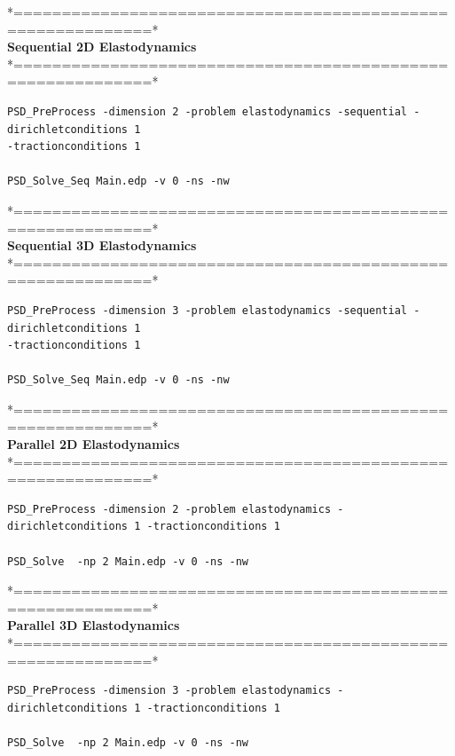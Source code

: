 {{*============================================================*\\
\textbf{ Sequential 2D Elastodynamics}  \\                    
*============================================================*\\

\begin{lstlisting}[style=Linux]
PSD_PreProcess -dimension 2 -problem elastodynamics -sequential -dirichletconditions 1  
-tractionconditions 1 

PSD_Solve_Seq Main.edp -v 0 -ns -nw
\end{lstlisting}
*============================================================*\\
\textbf{ Sequential 3D Elastodynamics}  \\                    
*============================================================*\\

\begin{lstlisting}[style=Linux]
PSD_PreProcess -dimension 3 -problem elastodynamics -sequential -dirichletconditions 1 
-tractionconditions 1 

PSD_Solve_Seq Main.edp -v 0 -ns -nw
\end{lstlisting}
*============================================================*\\
\textbf{ Parallel 2D Elastodynamics}   \\                   
*============================================================*\\

\begin{lstlisting}[style=Linux]
PSD_PreProcess -dimension 2 -problem elastodynamics -dirichletconditions 1 -tractionconditions 1 

PSD_Solve  -np 2 Main.edp -v 0 -ns -nw
\end{lstlisting}
*============================================================*\\
\textbf{ Parallel 3D Elastodynamics } \\                    
*============================================================*\\

\begin{lstlisting}[style=Linux]
PSD_PreProcess -dimension 3 -problem elastodynamics -dirichletconditions 1 -tractionconditions 1 

PSD_Solve  -np 2 Main.edp -v 0 -ns -nw
\end{lstlisting}

}}
